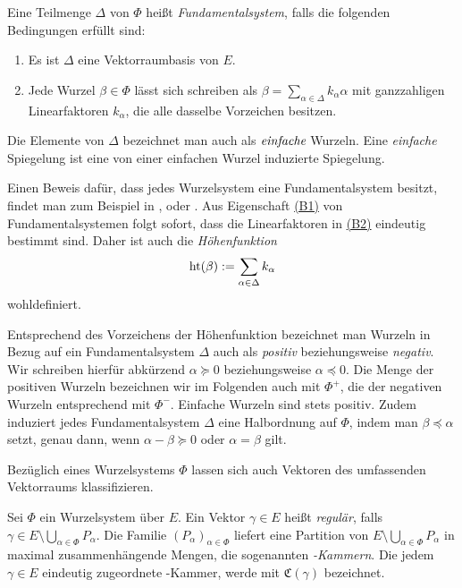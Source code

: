 \begin{defn}
  Eine Teilmenge $\Delta$ von $\Phi$ heißt \emph{Fundamentalsystem}, falls die folgenden Bedingungen erfüllt sind:
  \begin{enumerate}[(B1)]
    \item\label{it:B1} Es ist $\Delta$ eine Vektorraumbasis von $E$.
    \item\label{it:B2} Jede Wurzel $\beta \in \Phi$ lässt sich schreiben als $\beta = \sum_{\alpha \in \Delta} k_\alpha \alpha$ mit ganzzahligen Linearfaktoren $k_\alpha$, die alle dasselbe Vorzeichen besitzen.
  \end{enumerate}
  Die Elemente von $\Delta$ bezeichnet man auch als $\emph{einfache}$ Wurzeln.
  Eine \emph{einfache} Spiegelung ist eine von einer einfachen Wurzel induzierte Spiegelung.
\end{defn}

\begin{bem}
  Einen Beweis dafür, dass jedes Wurzelsystem eine Fundamentalsystem besitzt, findet man zum Beispiel in \cite[S.48]{humphreys1972introduction}, \cite[S.116]{erdmann2006introduction} oder \cite[S.208]{hall2015lie}.
  Aus Eigenschaft \hyperref[it:B1]{(B1)} von Fundamentalsystemen folgt sofort, dass die Linearfaktoren in \hyperref[it:B1]{(B2)} eindeutig bestimmt sind. 
  Daher ist auch die \emph{Höhenfunktion}
  \begin{displaymath}
    \operatorname{ht}(\beta) := \sum_{\alpha \in \Delta} k_\alpha 
  \end{displaymath}
  wohldefiniert.

  Entsprechend des Vorzeichens der Höhenfunktion bezeichnet man Wurzeln in Bezug auf ein Fundamentalsystem $\Delta$ auch als \emph{positiv} beziehungsweise \emph{negativ}.
  Wir schreiben hierfür abkürzend $\alpha \succeq 0$ beziehungsweise $\alpha \preceq 0$.
  Die Menge der positiven Wurzeln bezeichnen wir im Folgenden auch mit $\Phi^+$, die der negativen Wurzeln entsprechend mit $\Phi^-$.
  Einfache Wurzeln sind stets positiv.
 Zudem induziert jedes Fundamentalsystem $\Delta$ eine Halbordnung auf $\Phi$, indem man $\beta \preceq \alpha$ setzt, genau dann, wenn $\alpha - \beta \succeq 0$ oder  $\alpha = \beta$ gilt.
\end{bem}

Bezüglich eines Wurzelsystems $\Phi$ lassen sich auch Vektoren des umfassenden Vektorraums klassifizieren.

\begin{defn}
  Sei $\Phi$ ein Wurzelsystem über $E$.
  Ein Vektor $\gamma \in E$ heißt \emph{regulär}, falls $\gamma \in E \setminus \bigcup_{\alpha \in \Phi} P_\alpha$.
  Die Familie $(P_\alpha)_{\alpha \in \Phi}$ liefert eine Partition von $E\setminus \bigcup_{\alpha \in \Phi} P_\alpha$ in maximal zusammenhängende Mengen, die sogenannten \emph{\weyl\hyp{}Kammern}.
  Die jedem $\gamma \in E$ eindeutig zugeordnete \weyl\hyp{}Kammer, werde mit $\mathfrak{C}(\gamma)$ bezeichnet.
\end{defn}

